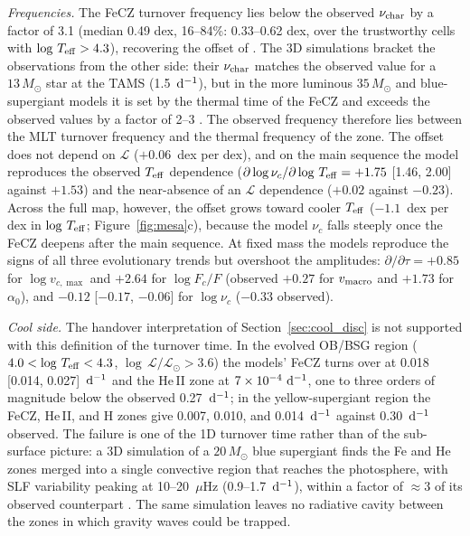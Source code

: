 \documentclass[twocolumn]{aastex631}
\newcommand{\vmac}{v_{\rm macro}}
\newcommand{\teff}{T_{\rm eff}}
\newcommand{\nuchar}{\nu_{\rm char}}
\renewcommand{\ell}{\mathcal{L}}
\newcommand{\lgL}{\log\,\ell/\ell_\odot}
\newcommand{\lgT}{\log\,\teff}
\newcommand{\dinv}{{\rm d}^{-1}}
\begin{document}
\emph{Frequencies.} The FeCZ turnover frequency lies below the observed $\nuchar$ by a factor of 3.1 (median 0.49 dex, 16--84\%: 0.33--0.62 dex, over the trustworthy cells with $\lgT>4.3$), recovering the offset of \citet{cantiello2021}. The 3D simulations bracket the observations from the other side: their $\nuchar$ matches the observed value for a $13\,M_\odot$ star at the TAMS (1.5~$\dinv$), but in the more luminous $35\,M_\odot$ and blue-supergiant models it is set by the thermal time of the FeCZ and exceeds the observed values by a factor of 2--3 \citep{schultz2022,schultz2023,ma2026}. The observed frequency therefore lies between the MLT turnover frequency and the thermal frequency of the zone. The offset does not depend on $\ell$ ($+0.06$~dex per dex), and on the main sequence the model reproduces the observed $\teff$ dependence ($\partial\log\nu_c/\partial\lgT=+1.75$ [1.46, 2.00] against $+1.53$) and the near-absence of an $\ell$ dependence ($+0.02$ against $-0.23$). Across the full map, however, the offset grows toward cooler $\teff$ ($-1.1$~dex per dex in $\lgT$; Figure~\ref{fig:mesa}c), because the model $\nu_c$ falls steeply once the FeCZ deepens after the main sequence. At fixed mass the models reproduce the signs of all three evolutionary trends but overshoot the amplitudes: $\partial/\partial\tau=+0.85$ for $\log v_{c,\max}$ and $+2.64$ for $\log F_c/F$ (observed $+0.27$ for $\vmac$ and $+1.73$ for $\alpha_0$), and $-0.12$ [$-0.17$, $-0.06$] for $\log\nu_c$ ($-0.33$ observed).

\emph{Cool side.} The handover interpretation of Section~\ref{sec:cool_disc} is not supported with this definition of the turnover time. In the evolved OB/BSG region ($4.0<\lgT<4.3$, $\lgL>3.6$) the models' FeCZ turns over at 0.018 [0.014, 0.027]~$\dinv$ and the He\,II zone at $7\times10^{-4}~\dinv$, one to three orders of magnitude below the observed 0.27~$\dinv$; in the yellow-supergiant region the FeCZ, He\,II, and H zones give 0.007, 0.010, and 0.014~$\dinv$ against 0.30~$\dinv$ observed. The failure is one of the 1D turnover time rather than of the sub-surface picture: a 3D simulation of a $20\,M_\odot$ blue supergiant finds the Fe and He zones merged into a single convective region that reaches the photosphere, with SLF variability peaking at 10--20~$\mu$Hz (0.9--1.7~$\dinv$), within a factor of $\approx3$ of its observed counterpart \citep{ma2026}. The same simulation leaves no radiative cavity between the zones in which gravity waves could be trapped.
\end{document}
